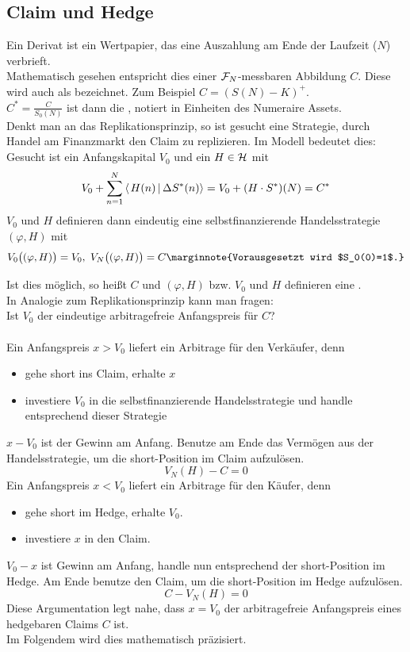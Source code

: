 \subsection{Claim und Hedge}
\label{sub:claim_hedge}
Ein Derivat ist ein Wertpapier, das eine Auszahlung am Ende der Laufzeit ($N$) verbrieft.\\
Mathematisch gesehen entspricht dies einer $\mathcal{F}_N$-messbaren Abbildung $C$.
Diese wird auch als  bezeichnet.
Zum Beispiel $C=(S(N)-K)^+$.\\
$C^*=\frac{C}{S_0(N)}$ ist dann die , notiert in Einheiten des Numeraire Assets.\\
Denkt man an das Replikationsprinzip, so ist gesucht eine Strategie, durch Handel am Finanzmarkt den Claim zu replizieren.
Im Modell bedeutet dies:\\
Gesucht ist ein Anfangskapital $V_0$ und ein $H\in \mathcal{H}$ mit 
\[
V_0+\sum_{n=1}^{N}\sprod{H(n)}{\Delta S^*(n)}=V_0+(H\cdot S^*)(N)=C^*
\]
$V_0$ und $H$ definieren dann eindeutig eine selbstfinanzierende Handelsstrategie $(\varphi,H)$ mit
\[
V_0\big((\varphi,H)\big)=V_0,~ V_N\big((\varphi,H)\big)=C\marginnote{Vorausgesetzt wird $S_0(0)=1$.}
\]

Ist dies möglich, so heißt $C$  und $(\varphi,H)$ bzw. $V_0$ und $H$ definieren eine .\\
In Analogie zum Replikationsprinzip kann man fragen:\\
Ist $V_0$ der eindeutige arbitragefreie Anfangspreis für $C$?\\

\\
Ein Anfangspreis $x>V_0$ liefert ein Arbitrage für den Verkäufer, denn 
\begin{itemize}
	\item gehe short ins Claim, erhalte $x$
	\item investiere $V_0$ in die selbstfinanzierende Handelsstrategie und handle entsprechend dieser Strategie
\end{itemize}
$x-V_0$ ist der Gewinn am Anfang.
Benutze am Ende das Vermögen aus der Handelsstrategie, um die short-Position im Claim aufzulösen.
\[
V_N(H)-C=0
\]
Ein Anfangspreis $x<V_0$ liefert ein Arbitrage für den Käufer, denn
\begin{itemize}
	\item gehe short im Hedge, erhalte $V_0$.
	\item investiere $x$ in den Claim.
\end{itemize}
$V_0-x$ ist Gewinn am Anfang, handle nun entsprechend der short-Position im Hedge.
Am Ende benutze den Claim, um die short-Position im Hedge aufzulösen.
\[
C-V_N(H)=0
\]
Diese Argumentation legt nahe, dass $x=V_0$ der arbitragefreie Anfangspreis eines hedgebaren Claims $C$ ist.\\
Im Folgendem wird dies mathematisch präzisiert.

